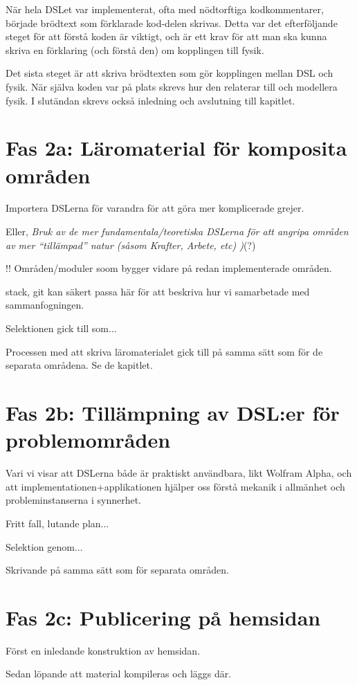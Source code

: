 \begin{draft}
När hela DSLet var implementerat, ofta med nödtorftiga kodkommentarer, började brödtext som förklarade kod-delen skrivas. Detta var det efterföljande steget för att förstå koden är viktigt, och är ett krav för att man ska kunna skriva en förklaring (och förstå den) om kopplingen till fysik.

Det sista steget är att skriva brödtexten som gör kopplingen mellan DSL och fysik. När själva koden var på plats skrevs hur den relaterar till och modellera fysik. I slutändan skrevs också inledning och avslutning till kapitlet.

\end{draft}
\begin{binge}
\section{Fas 2a: Läromaterial för komposita områden}

Importera DSLerna för varandra för att göra mer komplicerade grejer.

Eller, \emph{Bruk av de mer fundamentala/teoretiska DSLerna för att
  angripa områden av mer ``tillämpad'' natur (såsom Krafter, Arbete,
  etc) )}(?)

!! Områden/moduler soom bygger vidare på redan implementerade områden.

stack, git kan säkert passa här för att beskriva hur vi samarbetade med sammanfogningen.

Selektionen gick till som...

Processen med att skriva läromaterialet gick till på samma sätt som för de separata områdena. Se de kapitlet.


\section{Fas 2b: Tillämpning av DSL:er för problemområden}

Vari vi visar att DSLerna både är praktiskt användbara, likt Wolfram
Alpha, och att implementationen+applikationen hjälper oss förstå
mekanik i allmänhet och probleminstanserna i synnerhet.


Fritt fall, lutande plan...

Selektion genom...

Skrivande på samma sätt som för separata områden.

\section{Fas 2c: Publicering på hemsidan}

Först en inledande konstruktion av hemsidan.

Sedan löpande att material kompileras och läggs där.

\end{binge}
